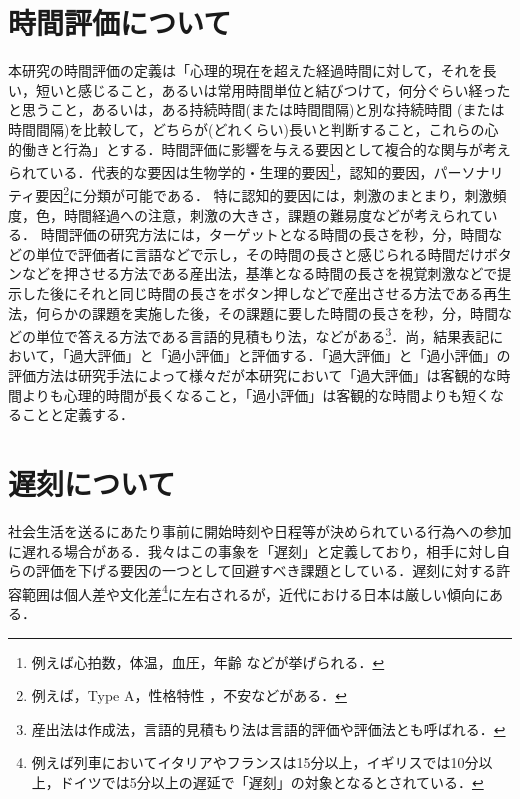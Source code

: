 \section{時間評価について}
本研究の時間評価の定義は「心理的現在を超えた経過時間に対して，それを長い，短いと感じること，あるいは常用時間単位と結びつけて，何分ぐらい経ったと思うこと，あるいは，ある持続時間(または時間間隔)と別な持続時間 (または時間間隔)を比較して，どちらが(どれくらい)長いと判断すること，これらの心的働きと行為」とする\cite{Matuda2009a}．時間評価に影響を与える要因として複合的な関与が考えられている．代表的な要因は生物学的・生理的要因\footnote{例えば心拍数\cite{MatudaHorie2011}\cite{MatudaIchikawa2015}，体温\cite{MatudaHorie2011}\cite{Hoagland1933}，血圧\cite{MatudaHorie2011}，年齢\cite{Espinosa2003}\cite{Ichikawa2009a}\cite{Kato2006} \cite{Murata2001}などが挙げられる．}，認知的要因，パーソナリティ要因\footnote{例えば，Type A\cite{Burnam1975}\cite{Orihara1993}\cite{Orihara1995}，性格特性\cite{Bell1972}\cite{Campos1966}\cite{Eysenck1959}\cite{Kato1967}\cite{Rammsayer1997} \cite{RammsayerRammstedt2000}\cite{Wudel1979}，不安\cite{Bar-Haim2010}\cite{Hare1963}などがある．}に分類が可能である．
特に認知的要因には，刺激のまとまり\cite{Matuda1965}，刺激頻度\cite{Matuda1967}，色\cite{Katuura2007}，時間経過への注意\cite{Fujiwara1994}，刺激の大きさ\cite{Ono2007}\cite{Thomas1975}，課題の難易度\cite{Matuda2009a}などが考えられている．
時間評価の研究方法には，ターゲットとなる時間の長さを秒，分，時間などの単位で評価者に言語などで示し，その時間の長さと感じられる時間だけボタンなどを押させる方法である産出法，基準となる時間の長さを視覚刺激などで提示した後にそれと同じ時間の長さをボタン押しなどで産出させる方法である再生法，何らかの課題を実施した後，その課題に要した時間の長さを秒，分，時間などの単位で答える方法である言語的見積もり法，などがある\cite{Ichikawa2008}\footnote{産出法は作成法，言語的見積もり法は言語的評価や評価法とも呼ばれる．}．尚，結果表記において，「過大評価」と「過小評価」と評価する．「過大評価」と「過小評価」の評価方法は研究手法によって様々だが\cite{Matuda1985}\cite{Shinohara1996}\cite{Kato2006}本研究において「過大評価」は客観的な時間よりも心理的時間が長くなること，「過小評価」は客観的な時間よりも短くなることと定義する．

\section{遅刻について}
社会生活を送るにあたり事前に開始時刻や日程等が決められている行為への参加に遅れる場合がある．我々はこの事象を「遅刻」と定義しており，相手に対し自らの評価を下げる要因の一つとして回避すべき課題としている．遅刻に対する許容範囲は個人差\cite{prtimes}や文化差\footnote{例えば列車においてイタリアやフランスは15分以上，イギリスでは10分以上，ドイツでは5分以上の遅延で「遅刻」の対象となるとされている\cite{train}．}に左右されるが，近代における日本は厳しい傾向にある\cite{delay}．

